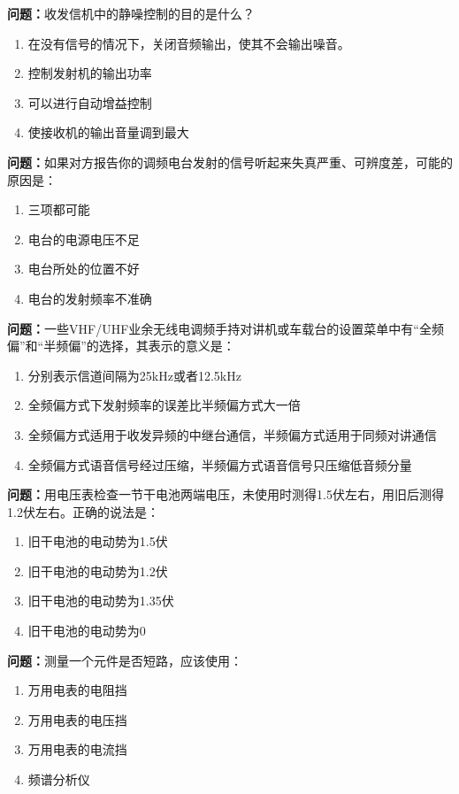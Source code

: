 \documentclass[UTF8]{ctexbook}
\begin{document}
\textbf{问题：}收发信机中的静噪控制的目的是什么？
\begin{enumerate}[label=\Alph*), leftmargin=3em]
  \item 在没有信号的情况下，关闭音频输出，使其不会输出噪音。
  \item 控制发射机的输出功率
  \item 可以进行自动增益控制
  \item 使接收机的输出音量调到最大
\end{enumerate}

\textbf{问题：}如果对方报告你的调频电台发射的信号听起来失真严重、可辨度差，可能的原因是：
\begin{enumerate}[label=\Alph*), leftmargin=3em]
  \item 三项都可能
  \item 电台的电源电压不足
  \item 电台所处的位置不好
  \item 电台的发射频率不准确
\end{enumerate}

\textbf{问题：}一些VHF/UHF业余无线电调频手持对讲机或车载台的设置菜单中有“全频偏”和“半频偏”的选择，其表示的意义是：
\begin{enumerate}[label=\Alph*), leftmargin=3em]
  \item 分别表示信道间隔为25kHz或者12.5kHz
  \item 全频偏方式下发射频率的误差比半频偏方式大一倍
  \item 全频偏方式适用于收发异频的中继台通信，半频偏方式适用于同频对讲通信
  \item 全频偏方式语音信号经过压缩，半频偏方式语音信号只压缩低音频分量
\end{enumerate}

\textbf{问题：}用电压表检查一节干电池两端电压，未使用时测得1.5伏左右，用旧后测得1.2伏左右。正确的说法是：
\begin{enumerate}[label=\Alph*), leftmargin=3em]
  \item 旧干电池的电动势为1.5伏
  \item 旧干电池的电动势为1.2伏
  \item 旧干电池的电动势为1.35伏
  \item 旧干电池的电动势为0
\end{enumerate}

\textbf{问题：}测量一个元件是否短路，应该使用：
\begin{enumerate}[label=\Alph*), leftmargin=3em]
  \item 万用电表的电阻挡
  \item 万用电表的电压挡
  \item 万用电表的电流挡
  \item 频谱分析仪
\end{enumerate}
\end{document}
